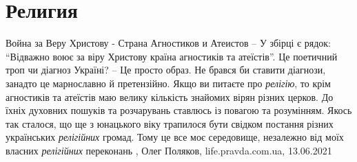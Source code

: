  
 
 
 
 
\chapter{Религия}
\label{sec:slova.religia}

Война за Веру Христову - Страна Агностиков и Атеистов
– У збірці є рядок: \enquote{Відважно воює за віру Христову країна агностиків та
атеїстів}. Це поетичний троп чи діагноз Україні?  – Це просто образ. Не брався
би ставити діагнози, занадто це марнославно й претензійно. Якщо ви питаєте про
\emph{релігію}, то крім агностиків та атеїстів маю велику кількість знайомих
вірян різних церков. До їхніх духовних пошуків та розчарувань ставлюсь із
повагою та розумінням. Якось так сталося, що ще з юнацького віку трапилося
бути свідком постання різних українських \emph{релігійних} громад. Тому це все
моє середовище, незалежно від моїх власних \emph{релігійних} переконань
, Олег Поляков, life.pravda.com.ua, 13.06.2021

